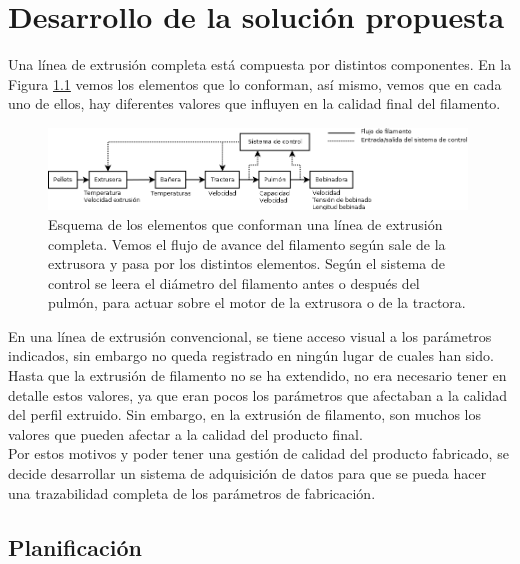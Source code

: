 \chapter{Desarrollo de la solución propuesta}
\label{cap:descrip}

Una línea de extrusión completa está compuesta por distintos componentes. En la Figura \ref{fig:esquema_extrusora} vemos los elementos que lo conforman, así mismo, vemos que en cada uno de ellos, hay diferentes valores que influyen en la calidad final del filamento.

\begin{figure}[H]
    \centering
    \includegraphics[width=0.99\textwidth]{images/esquema_extrusion.png}
    \caption[Esquema de los elementos que conforman una extrusora.]{Esquema de los elementos que conforman una línea de extrusión completa. Vemos el flujo de avance del filamento según sale de la extrusora y pasa por los distintos elementos. Según el sistema de control se leera el diámetro del filamento antes o después del pulmón, para actuar sobre el motor de la extrusora o de la tractora.}
    \label{fig:esquema_extrusora}
\end{figure}

En una línea de extrusión convencional, se tiene acceso visual a los parámetros indicados, sin embargo no queda registrado en ningún lugar de cuales han sido. Hasta que la extrusión de filamento no se ha extendido, no era necesario tener en detalle estos valores, ya que eran pocos los parámetros que afectaban a la calidad del perfil extruido. Sin embargo, en la extrusión de filamento, son muchos los valores que pueden afectar a la calidad del producto final.\\

Por estos motivos y poder tener una gestión de calidad del producto fabricado, se decide desarrollar un sistema de adquisición de datos para que se pueda hacer una trazabilidad completa de los parámetros de fabricación.\\

\section{Planificación}
\label{sec:planificacion}

